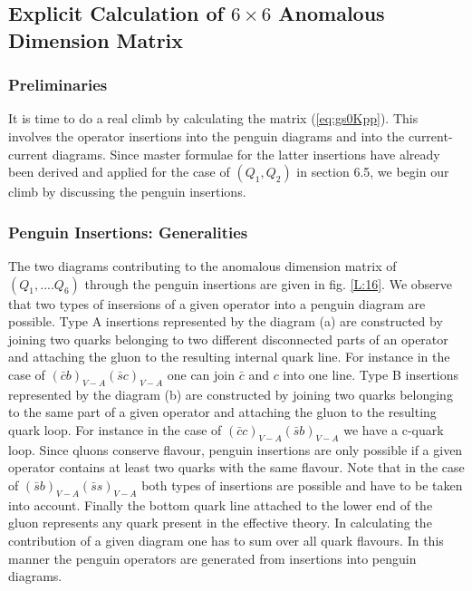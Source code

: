 \documentclass[12pt,rotate]{article}
\begin{document}
\begin{itemize}
\begin{itemize}
\subsection{Explicit Calculation of $6\times 6$ Anomalous Dimension
            Matrix}
\subsubsection{Preliminaries}
It is time to do a real climb by calculating the 
matrix (\ref{eq:gs0Kpp}). This involves the operator insertions
into the penguin diagrams and into the current-current diagrams. Since
master formulae for the latter insertions have already been derived
and applied for the case of $(Q_1,Q_2)$ in section 6.5, we begin our
climb
by discussing the penguin insertions.
\subsubsection{Penguin Insertions: Generalities}
The two diagrams contributing to the anomalous dimension matrix of
$(Q_1,....Q_6)$ through the penguin insertions are given in fig.
\ref{L:16}.
We observe that two types of insersions of a given operator into
a penguin diagram are possible. Type A insertions represented by the
diagram (a) are constructed by joining two quarks belonging to 
two different disconnected parts of an operator 
and attaching the gluon to the resulting internal quark line.
For instance in the case of $(\bar c b)_{V-A}(\bar s c)_{V-A}$
one can join $\bar c$ and $c$ into one line. Type B insertions
represented by the diagram (b) are constructed by joining two quarks
belonging to the same part of a given operator and attaching the
gluon to the resulting quark loop. For instance in the case of
$(\bar c c)_{V-A}(\bar s b)_{V-A}$ we have a c-quark loop. Since
qluons conserve flavour, penguin insertions are only possible
 if a given operator contains at least two quarks with the same
flavour. Note that in the case of $(\bar sb)_{V-A}(\bar s s)_{V-A}$
both types of insertions are possible and have to be taken into
account. Finally the bottom quark line attached to the lower end
of the gluon represents any quark present in the effective theory.
In calculating the contribution of a given diagram one has to sum
over all quark flavours. In this manner the penguin operators
are generated from insertions into penguin diagrams.
\begin{figure}[hbt]
\vspace{0.10in}
\centerline{
\epsfysize=1.5in
}
\end{figure}
\end{itemize}
\end{itemize}
\end{document}
